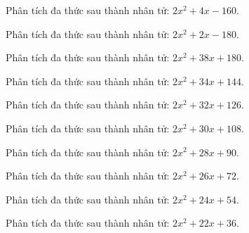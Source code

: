 \begin{bt}
	Phân tích đa thức sau thành nhân tử: $2 x^2 + 4 x - 160$.
\end{bt}
\begin{bt}
	Phân tích đa thức sau thành nhân tử: $2 x^2 + 2 x - 180$.
\end{bt}
\begin{bt}
	Phân tích đa thức sau thành nhân tử: $2 x^2 + 38 x + 180$.
\end{bt}
\begin{bt}
	Phân tích đa thức sau thành nhân tử: $2 x^2 + 34 x + 144$.
\end{bt}
\begin{bt}
	Phân tích đa thức sau thành nhân tử: $2 x^2 + 32 x + 126$.
\end{bt}
\begin{bt}
	Phân tích đa thức sau thành nhân tử: $2 x^2 + 30 x + 108$.
\end{bt}
\begin{bt}
	Phân tích đa thức sau thành nhân tử: $2 x^2 + 28 x + 90$.
\end{bt}
\begin{bt}
	Phân tích đa thức sau thành nhân tử: $2 x^2 + 26 x + 72$.
\end{bt}
\begin{bt}
	Phân tích đa thức sau thành nhân tử: $2 x^2 + 24 x + 54$.
\end{bt}
\begin{bt}
	Phân tích đa thức sau thành nhân tử: $2 x^2 + 22 x + 36$.
\end{bt}
